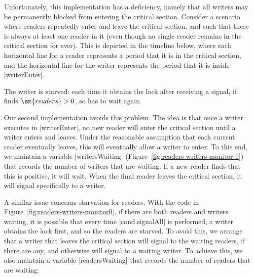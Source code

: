 
Unfortunately, this implementation has a deficiency, namely that all writers
may be permanently blocked from entering the critical section. 
%
Consider a scenario where readers repeatedly enter and leave the critical
section, and such that there is always at least one reader in it (even though
no single reader remains in the critical section for ever).  This is depicted
in the timeline below, where each horizontal line for a reader represents a
period that it is in the critical section, and the horizontal line for the
writer represents the period that it is inside |writerEnter|.
%
\begin{center}
\end{center}
%
The writer is starved: each time it obtains the lock after receiving a signal,
if finds $\sm{readers} > 0$, so has to wait again.

Our second implementation avoids this problem.  The idea is that once a writer
executes in |writerEnter|, no new reader will enter the critical section
until a writer enters and leaves.  Under the reasonable assumption that each
current reader eventually leaves, this will eventually allow a writer to
enter.  To this end, we maintain a variable |writersWaiting|
(Figure~\ref{fig:readers-writers-monitor-1}) that records the number of
writers that are waiting.  If a new reader finds that this is positive, it will
wait.  When the final reader leaves the critical section, it will signal
specifically to a writer.

A similar issue concerns starvation for readers.  With the code in
Figure~\ref{fig:readers-writers-monitor0}, if there are both readers and
writers waiting, it is possible that every time |cond.signalAll| is performed,
a writer obtains the lock first, and so the readers are starved.  To avoid
this, we arrange that a writer that leaves the critical section will signal to
the waiting readers, if there are any, and otherwise will signal to a
waiting writer.  To achieve this, we also maintain a variable |readersWaiting|
that records the number of readers that are waiting.

